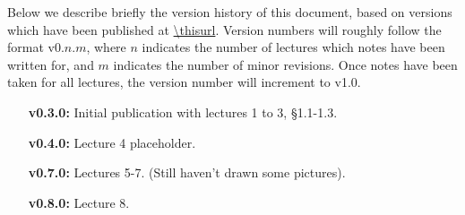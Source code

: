 Below we describe briefly the version history of this document, based on
versions which have been published at \url{\thisurl}. Version numbers will
roughly follow the format v0.$n$.$m$, where $n$ indicates the number of
lectures which notes have been written for, and $m$ indicates the number of
minor revisions. Once notes have been taken for all lectures, the version
number will increment to v1.0.

\begin{enumerate}
\item[\bf v0.3.0:] Initial publication with lectures 1 to 3, \S1.1-1.3.
\item[\bf v0.4.0:] Lecture 4 placeholder.
\item[\bf v0.7.0:] Lectures 5-7. (Still haven't drawn some pictures).
\item[\bf v0.8.0:] Lecture 8.
\end{enumerate}
